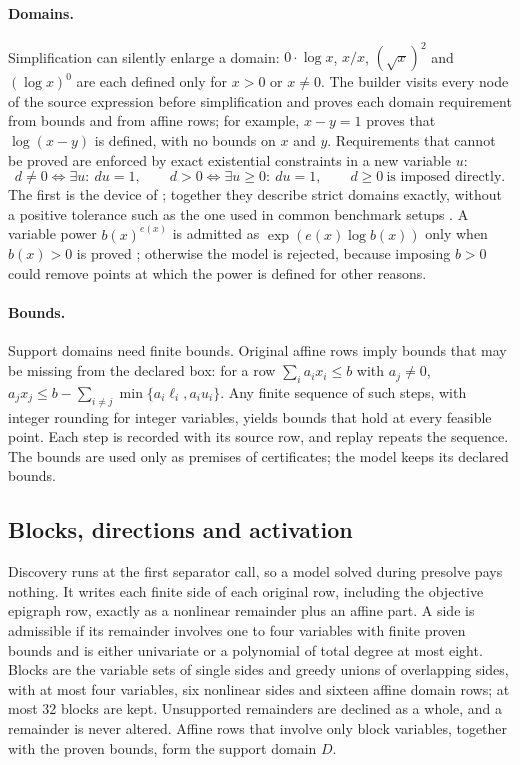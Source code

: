 \paragraph{Domains.}
Simplification can silently enlarge a domain: $0\cdot\log x$, $x/x$,
$(\sqrt x)^2$ and $(\log x)^0$ are each defined only for $x>0$ or $x\ne0$.
The builder visits every node of the source expression before
simplification and proves each domain requirement from bounds and from
affine rows; for example, $x-y=1$ proves that $\log(x-y)$ is defined, with
no bounds on $x$ and $y$. Requirements that cannot be proved are enforced
by exact existential constraints in a new variable $u$:
\[
d\ne0\iff\exists u:\ du=1,\qquad d>0\iff\exists u\ge0:\ du=1,\qquad d\ge0\ \text{is imposed directly.}
\]
The first is the device of \citet{Rabinowitsch1930}; together they describe
strict domains exactly, without a positive tolerance such as the one used
in common benchmark setups \citep{BestuzhevaEtAl2025}. A variable power
$b(x)^{e(x)}$ is admitted as $\exp(e(x)\log b(x))$ only when $b(x)>0$ is
proved \citep[compare][]{BelottiEtAl2009}; otherwise the model is rejected,
because imposing $b>0$ could remove points at which the power is defined
for other reasons.

\paragraph{Bounds.}
Support domains need finite bounds. Original affine rows imply bounds
that may be missing from the declared box: for a row
$\sum_ia_ix_i\le b$ with $a_j\ne0$,
$a_jx_j\le b-\sum_{i\ne j}\min\{a_i\ell_i,a_iu_i\}$. Any finite sequence of
such steps, with integer rounding for integer variables, yields bounds
that hold at every feasible point. Each step is recorded with its source
row, and replay repeats the sequence. The bounds are used only as
premises of certificates; the model keeps its declared bounds.

\subsection{Blocks, directions and activation}\label{sec:blocks}

Discovery runs at the first separator call, so a model solved during
presolve pays nothing. It writes each finite side of each original row,
including the objective epigraph row, exactly as a nonlinear remainder
plus an affine part. A side is admissible if its remainder involves one
to four variables with finite proven bounds and is either univariate or
a polynomial of total degree at most eight. Blocks are the variable sets
of single sides and greedy unions of overlapping sides, with at most four
variables, six nonlinear sides and sixteen affine domain rows; at most 32
blocks are kept. Unsupported remainders are declined as a whole, and a
remainder is never altered. Affine rows that involve only block variables,
together with the proven bounds, form the support domain $D$.

